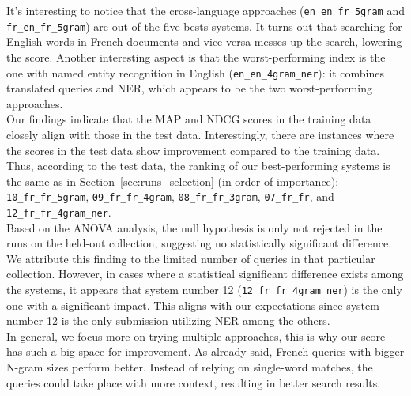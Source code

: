 It's interesting to notice that the cross-language approaches (\texttt{en\_en\_fr\_5gram} and
\texttt{fr\_en\_fr\_5gram}) are out of the five bests systems.
It turns out that searching for English words in French documents and vice versa messes up the search, lowering the
score.
Another interesting aspect is that the worst-performing index is the one with named entity recognition in English
(\texttt{en\_en\_4gram\_ner}): it combines translated queries and NER, which appears to be the two worst-performing
approaches.\\

Our findings indicate that the MAP and NDCG scores in the training data closely align with those in the test data.
Interestingly, there are instances where the scores in the test data show improvement compared to the training data.
Thus, according to the test data, the ranking of our best-performing systems is the same as in
Section~\ref{sec:runs_selection} (in order of importance): \texttt{10\_fr\_fr\_5gram},
\texttt{09\_fr\_fr\_4gram}, \texttt{08\_fr\_fr\_3gram}, \texttt{07\_fr\_fr}, and \texttt{12\_fr\_fr\_4gram\_ner}.\\

Based on the ANOVA analysis, the null hypothesis is only not rejected in the runs on the held-out collection, suggesting
no statistically significant difference.
We attribute this finding to the limited number of queries in that particular collection.
However, in cases where a statistical significant difference exists among the systems, it appears that system number 12
(\texttt{12\_fr\_fr\_4gram\_ner}) is the only one with a significant impact.
This aligns with our expectations since system number 12 is the only submission utilizing NER among the others.\\

In general, we focus more on trying multiple approaches, this is why our score has such a big space for improvement.
As already said, French queries with bigger N-gram sizes perform better.
Instead of relying on single-word matches, the queries could take place with more context, resulting in better search
results.\\

\newpage